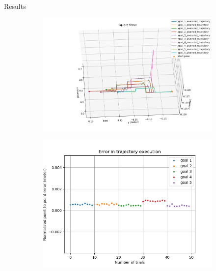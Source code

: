 \documentclass{beamer}
\begin{document}
		
	\begin{frame}{Results}
		\begin{figure}
			\begin{subfigure}[b]{0.49\linewidth}
				\includegraphics[scale=0.25]{images/1/square.png}
			\end{subfigure}
			\begin{subfigure}[b]{0.49\linewidth}
				\includegraphics[scale=0.25]{images/1/square_e.png}
			\end{subfigure}	
		\end{figure}
	\end{frame}
\end{document}
